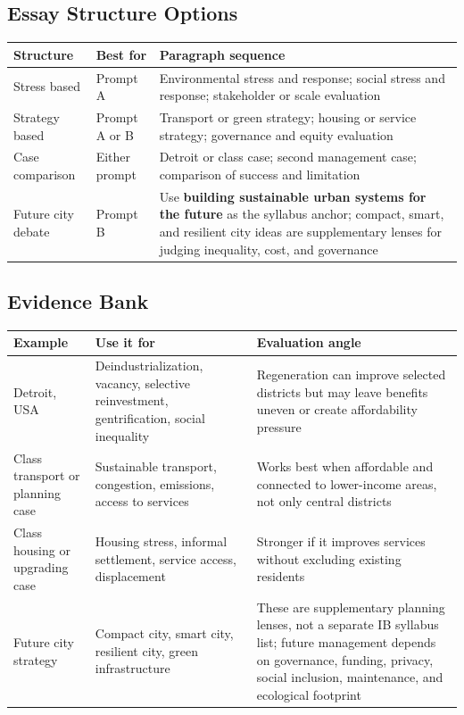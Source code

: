 \documentclass[11pt,a4paper]{article}
\newcommand{\term}[1]{\textcolor{HeadingBlue}{\textbf{#1}}}
\begin{document}
\subsection{Essay Structure Options}

\begin{tabularx}{\textwidth}{L{0.22\textwidth}Y Y}
\toprule
\textbf{Structure} & \textbf{Best for} & \textbf{Paragraph sequence} \\
\midrule
Stress based & Prompt A & Environmental stress and response; social stress and
response; stakeholder or scale evaluation \\
Strategy based & Prompt A or B & Transport or green strategy; housing or
service strategy; governance and equity evaluation \\
Case comparison & Either prompt & Detroit or class case; second management
case; comparison of success and limitation \\
Future city debate & Prompt B & Use \term{building sustainable urban systems
for the future} as the syllabus anchor; compact, smart, and resilient city
ideas are supplementary lenses for judging inequality, cost, and governance \\
\bottomrule
\end{tabularx}

\subsection{Evidence Bank}

\begin{tabularx}{\textwidth}{L{0.2\textwidth}Y Y}
\toprule
\textbf{Example} & \textbf{Use it for} & \textbf{Evaluation angle} \\
\midrule
Detroit, USA & Deindustrialization, vacancy, selective reinvestment,
gentrification, social inequality & Regeneration can improve selected districts
but may leave benefits uneven or create affordability pressure \\
Class transport or planning case & Sustainable transport, congestion, emissions,
access to services & Works best when affordable and connected to lower-income
areas, not only central districts \\
Class housing or upgrading case & Housing stress, informal settlement, service
access, displacement & Stronger if it improves services without excluding
existing residents \\
Future city strategy & Compact city, smart city, resilient city, green
infrastructure & These are supplementary planning lenses, not a separate IB
syllabus list; future management depends on governance, funding, privacy, social
inclusion, maintenance, and ecological footprint \\
\bottomrule
\end{tabularx}
\end{document}
